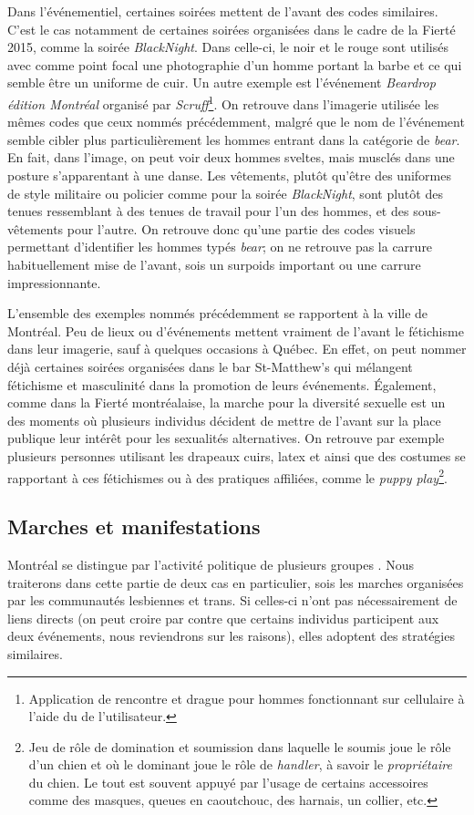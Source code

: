 Dans l'événementiel, certaines soirées mettent de l'avant des codes similaires.
C'est le cas notamment de certaines soirées organisées dans le cadre de la Fierté 2015, comme la soirée  \emph{BlackNight}.
Dans celle-ci, le noir et le rouge sont utilisés avec comme point focal une photographie d'un homme portant la barbe et ce qui semble être un uniforme de cuir.
Un autre exemple est l'événement \emph{Beardrop édition Montréal} organisé par \emph{Scruff}\footnote{Application de rencontre et drague pour hommes fonctionnant sur cellulaire à l'aide du \gps{} de l'utilisateur.}.
On retrouve dans l'imagerie utilisée les mêmes codes que ceux nommés précédemment, malgré que le nom de l'événement semble cibler plus particulièrement les hommes entrant dans la catégorie de \emph{bear}.
En fait, dans l'image, on peut voir deux hommes sveltes, mais musclés dans une posture s'apparentant à une danse.
Les vêtements, plutôt qu'être des uniformes de style militaire ou policier comme pour la soirée \emph{BlackNight}, sont plutôt des tenues ressemblant à des tenues de travail pour l'un des hommes, et des sous-vêtements pour l'autre.
On retrouve donc qu'une partie des codes visuels permettant d'identifier les hommes typés \emph{bear}; on ne retrouve pas la carrure habituellement mise de l'avant, sois un surpoids important ou une carrure impressionnante.

L'ensemble des exemples nommés précédemment se rapportent à la ville de Montréal.
Peu de lieux ou d'événements mettent vraiment de l'avant le fétichisme dans leur imagerie, sauf à quelques occasions à Québec.
En effet, on peut nommer déjà certaines soirées organisées dans le bar St-Matthew's qui mélangent fétichisme et masculinité dans la promotion de leurs événements.
Également, comme dans la Fierté montréalaise, la marche pour la diversité sexuelle est un des moments où plusieurs individus décident de mettre de l'avant sur la place publique leur intérêt pour les sexualités alternatives.
On retrouve par exemple plusieurs personnes utilisant les drapeaux cuirs, latex et \bdsm{} ainsi que des costumes se rapportant à ces fétichismes ou à des pratiques affiliées, comme le \emph{puppy play}\footnote{Jeu de rôle de domination et soumission dans laquelle le soumis joue le rôle d'un chien  et où le dominant joue le rôle de \emph{handler}, à savoir le \emph{propriétaire} du chien. Le tout est souvent appuyé par l'usage de certains accessoires comme des masques, queues en caoutchouc, des harnais, un collier, etc.}.

\subsection{Marches et manifestations}
\label{subsec:label}
 Montréal se distingue par l'activité politique de plusieurs groupes \lgbt{}.
Nous traiterons dans cette partie de deux cas en particulier, sois les marches organisées par les communautés lesbiennes et trans. Si celles-ci n'ont pas nécessairement de liens directs (on peut croire par contre que certains individus participent aux deux événements, nous reviendrons sur les raisons), elles adoptent des stratégies similaires.

